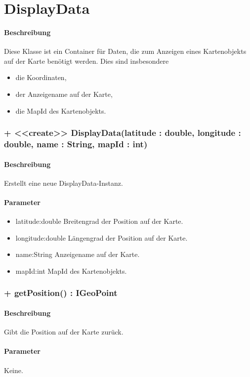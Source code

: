 \section{DisplayData}
\paragraph*{Beschreibung}
Diese Klasse ist ein Container für Daten, die zum Anzeigen eines Kartenobjekts auf der 
Karte benötigt werden. Dies sind insbesondere
\begin{itemize}
    \item die Koordinaten,
    \item der Anzeigename auf der Karte,
    \item die MapId des Kartenobjekts.
\end{itemize}

\subsubsection{+ <<create>> DisplayData(latitude : double, longitude : double, name : String, mapId : int)}%
\paragraph*{Beschreibung}
Erstellt eine neue DisplayData-Instanz.
\paragraph*{Parameter}
\begin{itemize}
    \item latitude:double Breitengrad der Position auf der Karte.
    \item longitude:double Längengrad der Position auf der Karte.
    \item name:String Anzeigename auf der Karte.
    \item mapId:int MapId des Kartenobjekts.
\end{itemize}

\subsubsection{+ getPosition() : IGeoPoint}%
\paragraph*{Beschreibung}
Gibt die Position auf der Karte zurück.
\paragraph*{Parameter}
Keine.
